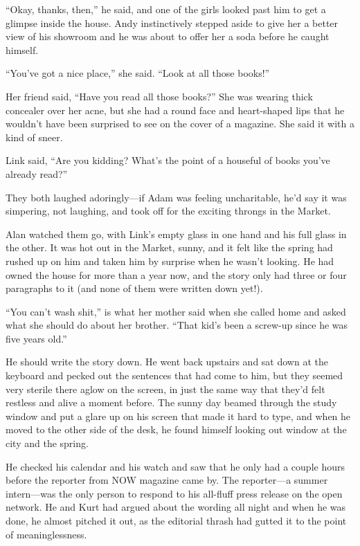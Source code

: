 \documentclass{article}
\begin{document}
``Okay, thanks, then,'' he said, and one of the girls looked past him
to get a glimpse inside the house.  Andy instinctively stepped aside
to give her a better view of his showroom and he was about to offer
her a soda before he caught himself.

``You've got a nice place,'' she said.  ``Look at all those books!''

Her friend said, ``Have you read all those books?'' She was wearing
thick concealer over her acne, but she had a round face and
heart-shaped lips that he wouldn't have been surprised to see on the
cover of a magazine.  She said it with a kind of sneer.

Link said, ``Are you kidding?  What's the point of a houseful of books
you've already read?''

They both laughed adoringly---if Adam was feeling uncharitable, he'd
say it was simpering, not laughing, and took off for the exciting
throngs in the Market.

Alan watched them go, with Link's empty glass in one hand and his full
glass in the other.  It was hot out in the Market, sunny, and it felt
like the spring had rushed up on him and taken him by surprise when he
wasn't looking.  He had owned the house for more than a year now, and
the story only had three or four paragraphs to it (and none of them
were written down yet!).

``You can't wash shit,'' is what her mother said when she called home
and asked what she should do about her brother.  ``That kid's been a
screw-up since he was five years old.''

He should write the story down.  He went back upstairs and sat down at
the keyboard and pecked out the sentences that had come to him, but
they seemed very sterile there aglow on the screen, in just the same
way that they'd felt restless and alive a moment before.  The sunny
day beamed through the study window and put a glare up on his screen
that made it hard to type, and when he moved to the other side of the
desk, he found himself looking out window at the city and the spring.

He checked his calendar and his watch and saw that he only had a
couple hours before the reporter from NOW magazine came by.  The
reporter---a summer intern---was the only person to respond to his
all-fluff press release on the open network.  He and Kurt had argued
about the wording all night and when he was done, he almost pitched it
out, as the editorial thrash had gutted it to the point of
meaninglessness.
\end{document}
